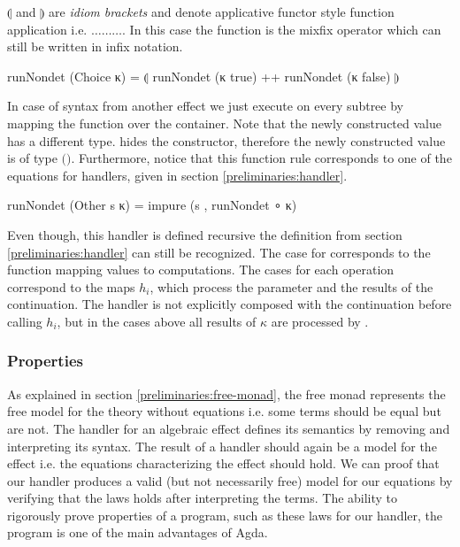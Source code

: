 \begin{AgdaAlign}
  $\llparenthesis$ and $\rrparenthesis$ are \textit{idiom brackets} and denote
  applicative functor style function application i.e.
  \AgdaSpace{}\AgdaSpace{}\AgdaFunction{<*>}$\dots$\AgdaFunction{<*>}$\dots$\AgdaFunction{<*>}$\dots$.
  In this case the function  is the mixfix operator
  \AgdaFunction{\_++\_} which can still be written in infix notation.
  \begin{code}
runNondet (Choice κ)   = ⦇ runNondet (κ true) ++ runNondet (κ false) ⦈
  \end{code}
  In case of syntax from another effect we just execute 
  on every subtree by mapping the function over the container.
  Note that the newly constructed value has a different type.
   hides the 
  constructor, therefore the newly constructed 
  value is of type
  \AgdaSpace{}\AgdaSpace{}$($\AgdaSpace{}$)$.
  Furthermore, notice that this function rule corresponds to one of the equations
  for handlers, given in section \ref{preliminaries:handler}.
  \begin{code}
runNondet (Other s κ)  = impure (s , runNondet ∘ κ)
  \end{code}
  Even though, this handler is defined recursive the definition from section
  \ref{preliminaries:handler} can still be recognized.
  The case for  corresponds to the function
  mapping values to computations.
  The cases for each operation correspond to the maps $h_i$, which process the
  parameter and the results of the continuation.
  The handler is not explicitly composed with the continuation before calling
  $h_i$, but in the cases above all results of $\kappa$ are processed by
  .
\end{AgdaAlign}


\subsubsection{Properties}
\label{first-order:nondet:properties}

As explained in section \ref{preliminaries:free-monad}, the free monad
represents the free model for the theory without equations i.e. some terms
should be equal but are not.
The handler for an algebraic effect defines its semantics by removing and
interpreting its syntax.
The result of a handler should again be a model for the effect i.e. the
equations characterizing the effect should hold.
We can proof that our handler produces a valid (but not necessarily free) model
for our equations by verifying that the laws holds after interpreting the terms.
The ability to rigorously prove properties of a program, such as these laws for
our handler, the program is one of the main advantages of Agda.

